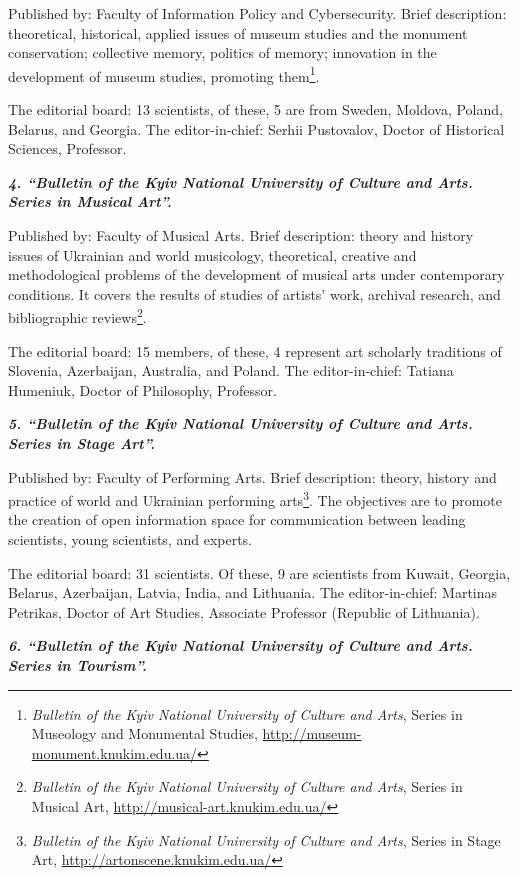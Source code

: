 \documentclass[a4paper,
fontsize=11pt,
oneside,
numbers=noperiodatend,
parskip=half-,
bibliography=totoc,
final
]{scrartcl}
\begin{document}
Published by: Faculty of Information Policy and Cybersecurity. Brief
description: theoretical, historical, applied issues of museum studies
and the monument conservation; collective memory, politics of memory;
innovation in the development of museum studies, promoting
them\footnote{\emph{Bulletin of the Kyiv National University of Culture
  and Arts}, Series in Museology and Monumental Studies,
  \url{http://museum-monument.knukim.edu.ua/}}.

The editorial board: 13 scientists, of these, 5 are from Sweden,
Moldova, Poland, Belarus, and Georgia. The editor-in-chief: Serhii
Pustovalov, Doctor of Historical Sciences, Professor.

\textbf{\emph{4. \enquote{Bulletin of the Kyiv National University of
Culture and Arts. Series in Musical Art}.}}

Published by: Faculty of Musical Arts. Brief description: theory and
history issues of Ukrainian and world musicology, theoretical, creative
and methodological problems of the development of musical arts under
contemporary conditions. It covers the results of studies of artists'
work, archival research, and bibliographic reviews\footnote{\emph{Bulletin
  of the Kyiv National University of Culture and Arts}, Series in
  Musical Art, \url{http://musical-art.knukim.edu.ua/}}.

The editorial board: 15 members, of these, 4 represent art scholarly
traditions of Slovenia, Azerbaijan, Australia, and Poland. The
editor-in-chief: Tatiana Humeniuk, Doctor of Philosophy, Professor.

\textbf{\emph{5. \enquote{Bulletin of the Kyiv National University of
Culture and Arts. Series in Stage Art}.}}

Published by: Faculty of Performing Arts. Brief description: theory,
history and practice of world and Ukrainian performing arts\footnote{\emph{Bulletin
  of the Kyiv National University of Culture and Arts}, Series in Stage
  Art, \url{http://artonscene.knukim.edu.ua/}}. The objectives are to
promote the creation of open information space for communication between
leading scientists, young scientists, and experts.

The editorial board: 31 scientists. Of these, 9 are scientists from
Kuwait, Georgia, Belarus, Azerbaijan, Latvia, India, and Lithuania. The
editor-in-chief: Martinas Petrikas, Doctor of Art Studies, Associate
Professor (Republic of Lithuania).

\textbf{\emph{6. \enquote{Bulletin of the Kyiv National University of
Culture and Arts. Series in Tourism}.}}
\end{document}
